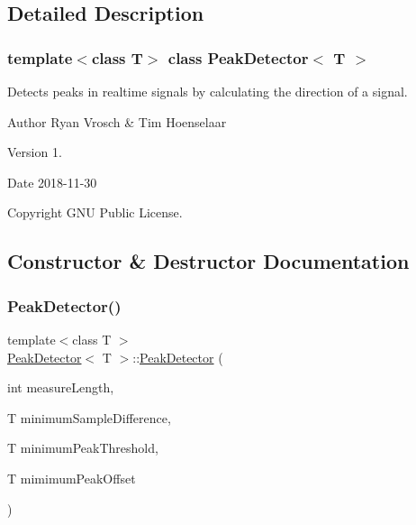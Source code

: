 \subsection{Detailed Description}
\subsubsection*{template$<$class T$>$\newline
class Peak\+Detector$<$ T $>$}

Detects peaks in realtime signals by calculating the direction of a signal. 

\begin{DoxyAuthor}{Author}
Ryan Vrosch \& Tim Hoenselaar 
\end{DoxyAuthor}
\begin{DoxyVersion}{Version}
1. 
\end{DoxyVersion}
\begin{DoxyDate}{Date}
2018-\/11-\/30 
\end{DoxyDate}
\begin{DoxyCopyright}{Copyright}
G\+NU Public License. 
\end{DoxyCopyright}


\subsection{Constructor \& Destructor Documentation}
\mbox{\label{class_peak_detector_a616829654acf46b8574903d9abcdaf9d}} 
\subsubsection{\texorpdfstring{Peak\+Detector()}{PeakDetector()}}
{\footnotesize\ttfamily template$<$class T $>$ \\
\mbox{\hyperlink{class_peak_detector}{Peak\+Detector}}$<$ T $>$\+::\mbox{\hyperlink{class_peak_detector}{Peak\+Detector}} (\begin{DoxyParamCaption}\item[{int}]{measure\+Length,  }\item[{T}]{minimum\+Sample\+Difference,  }\item[{T}]{minimum\+Peak\+Threshold,  }\item[{T}]{mimimum\+Peak\+Offset }\end{DoxyParamCaption})}



